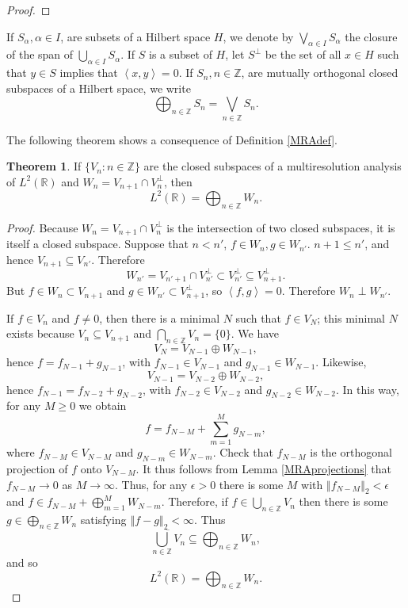 \documentclass{article}
\newcommand{\inner}[2]{\left\langle #1, #2 \right\rangle}
\newcommand{\norm}[1]{\left\Vert #1 \right\Vert}
\theoremstyle{definition}
\newtheorem{theorem}{Theorem}
\theoremstyle{definition}
\begin{document}
\begin{proof}
\end{proof}

If $S_\alpha, \alpha \in I$, are subsets of a Hilbert space $H$, we denote by 
$\bigvee_{\alpha \in I} S_\alpha$ the closure of the span of $\bigcup_{\alpha \in I} S_\alpha$. If $S$ is a subset of $H$, let $S^\perp$ be the set
of all $x \in H$ such that $y \in S$ implies that $\inner{x}{y}=0$. If $S_n, n \in \mathbb{Z}$, are mutually orthogonal closed subspaces of a Hilbert space, we write
\[
\bigoplus_{n \in \mathbb{Z}} S_n = \bigvee_{n \in \mathbb{Z}} S_n.
\]

The following theorem shows a consequence of Definition \ref{MRAdef}.

\begin{theorem}
If $\{V_n: n \in \mathbb{Z}\}$ are the closed subspaces of a multiresolution analysis of $L^2(\mathbb{R})$ and $W_n=V_{n+1} \cap V_n^\perp$, then
\[
L^2(\mathbb{R}) = \bigoplus_{n \in \mathbb{Z}} W_n.
\]
\end{theorem}
\begin{proof}
Because $W_n=V_{n+1} \cap V_n^\perp$ is the intersection of two closed subspaces, it is itself a closed subspace. 
Suppose that $n < n'$, $f \in W_n, g \in W_{n'}$.  $n+1 \leq n'$, and hence $V_{n+1} \subseteq V_{n'}$. Therefore
\[
W_{n'} = V_{n'+1} \cap V_{n'}^\perp \subset V_{n'}^\perp \subseteq V_{n+1}^\perp.
\]
But $f \in W_n \subset V_{n+1}$ and $g \in W_{n'} \subset V_{n+1}^\perp$, so $\inner{f}{g}=0$. Therefore $W_n \perp W_{n'}$.


If $f \in V_n$ and $f \neq 0$, then there is a minimal $N$ such that $f \in V_N$; this minimal $N$ exists because $V_n \subseteq V_{n+1}$ and $\bigcap_{n \in \mathbb{Z}} V_n=
\{0\}$. We have
\[
V_N = V_{N-1} \oplus W_{N-1},
\]
hence $f=f_{N-1} + g_{N-1}$, with $f_{N-1} \in V_{N-1}$ and $g_{N-1} \in W_{N-1}$. Likewise,
\[
V_{N-1} = V_{N-2} \oplus W_{N-2},
\]
hence $f_{N-1} = f_{N-2}+g_{N-2}$, with $f_{N-2} \in V_{N-2}$ and $g_{N-2} \in W_{N-2}$. In this way, for any $M \geq 0$ we obtain
\[
f =f_{N-M}+ \sum_{m=1}^M g_{N-m},
\]
where $f_{N-M} \in V_{N-M}$ and $g_{N-m} \in W_{N-m}$. Check that $f_{N-M}$ is the orthogonal projection of $f$ onto $V_{N-M}$. It thus
 follows from Lemma \ref{MRAprojections} that $f_{N-M} \to 0$ as $M \to \infty$. Thus, for any $\epsilon>0$ there is some $M$ with
$\norm{f_{N-M}}_2<\epsilon$ and $f \in f_{N-M} + \bigoplus_{m=1}^M W_{N-m}$. Therefore, if $f \in \bigcup_{n \in \mathbb{Z}} V_n$ then
there is some $g \in \bigoplus_{n \in \mathbb{Z}} W_n$
satisfying $\norm{f-g}_2 < \infty$. Thus
\[
\overline{\bigcup_{n \in \mathbb{Z}} V_n} \subseteq \bigoplus_{n \in \mathbb{Z}} W_n,
\]
and so
\[
L^2(\mathbb{R}) = \bigoplus_{n \in \mathbb{Z}} W_n.
\]
\end{proof}
\end{document}
